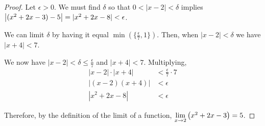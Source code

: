 \documentclass{agony}
\begin{document}
\begin{proof}
  Let $\epsilon > 0$.
  We must find $\delta$ so that $0<|x-2|<\delta$ implies $\abs{(x^2+2x-3)-5}=|x^2+2x-8|<\epsilon$.

  We can limit $\delta$ by having it equal $\min(\{\frac\epsilon7,1\})$.
  Then, when $|x-2| < \delta$ we have $|x+4| < 7$.

  We now have $|x-2| < \delta \leq \frac\epsilon7$ and $|x+4| < 7$. Multiplying,
  \begin{align*}
    |x-2|\cdot|x+4| & < \frac\epsilon7\cdot7 \\
    |(x-2)(x+4)|    & < \epsilon             \\
    |x^2+2x-8|      & < \epsilon
  \end{align*}

  Therefore, by the \epsdel{} definition of the limit of a function, $\lim\limits_{x\to2}\left(x^2+2x-3\right)=5$.
\end{proof}
\end{document}

